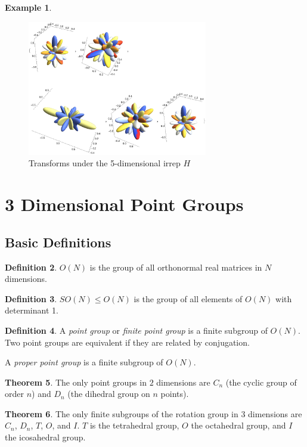 \documentclass[12pt, letterpaper]{article}
\theoremstyle{definition} %
\newtheorem{thm}{Theorem}[section] %
\newtheorem{defn}[thm]{Definition} %
\newtheorem{ex}[thm]{Example}
\begin{document}
\begin{ex}
\begin{figure}[H]
\centering
\includegraphics[width=0.7\textwidth]{spindecomp65}
\caption{Transforms under the 5-dimensional irrep $H$}
  \label{figure-spin65}
\end{figure}
\end{ex}


\section{3 Dimensional Point Groups}
\subsection{Basic Definitions}

\begin{defn}
  $O(N)$ is the group of all orthonormal real matrices in $N$ dimensions.
\end{defn}
\begin{defn}
  $SO(N)\leq O(N)$ is the group of all elements of $O(N)$ with determinant 1.
\end{defn}
\begin{defn}
  A \emph{point group} or \emph{finite point group} is a finite subgroup of $O(N)$. Two point groups are equivalent if they are related by conjugation.

  A \emph{proper point group} is a finite subgroup of $O(N)$. 
\end{defn}

\begin{thm}
  The only point groups in $2$ dimensions are $C_n$ (the cyclic group of order 
  $n$) and $D_n$ (the dihedral group on $n$ points).
\end{thm}

\begin{thm}
  The only finite subgroups of the rotation group in 3 dimensions are $C_n$, $D_n$,
  $T$, $O$, and $I$. $T$ is the tetrahedral group, $O$ the octahedral group,
  and $I$ the icosahedral group.
\end{thm}
\end{document}
